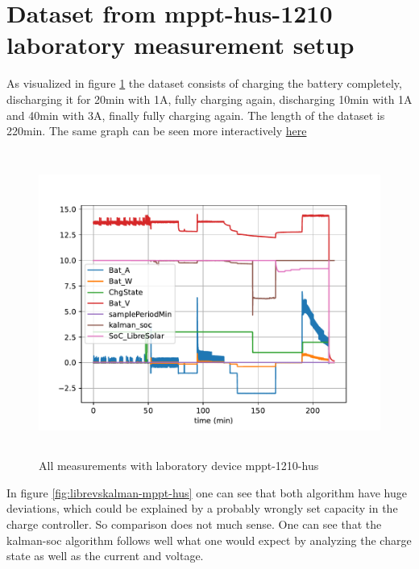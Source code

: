 \pagebreak

\section{Dataset from mppt-hus-1210 laboratory measurement setup}

As visualized in figure \ref{fig:librevskalman-mppt-1210-hus-all} the dataset consists of charging the battery completely, discharging it for 20min with 1A, fully charging again, discharging 10min with 1A and 40min with 3A, finally fully charging again. The length of the dataset is 220min. The same graph can be seen more interactively \href{https://raw.githack.com/mulles/kalman-soc/main/data/mppt-1210-hus_2021-05-28T20:10:00.000Z-2021-05-29T02:19:00.000Z_SOC_Graph.html}{here} 

\begin{figure}[h!]
\centering	
\includegraphics[width=16cm,height=10cm]{mppt-1210-hus-2021-05-28T20:10:00.000Z-2021-05-29T02:19:00.000Z-librevskalman-all.pdf}
\caption{\label{fig:librevskalman-mppt-1210-hus-all} All measurements with laboratory device mppt-1210-hus}
\end{figure}

\pagebreak 

In figure \ref{fig:librevskalman-mppt-hus} one can see that both algorithm have huge deviations, which could be explained by a probably wrongly set capacity in the charge controller. So comparison does not much sense. One can see that the kalman-soc algorithm follows well what one would expect by analyzing the charge state as well as the current and voltage. 

